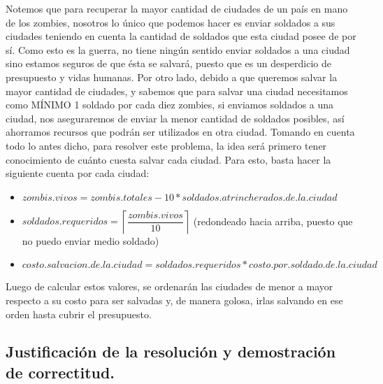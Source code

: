 Notemos que para recuperar la mayor cantidad de ciudades de un país en mano de los zombies, nosotros lo único que podemos hacer es enviar soldados a sus ciudades teniendo en cuenta la cantidad de soldados que esta ciudad posee de por sí. Como esto es la guerra, no tiene ningún sentido enviar soldados a una ciudad sino estamos seguros de que ésta se salvará, puesto que es un desperdicio de presupuesto y vidas humanas. Por otro lado, debido a que queremos salvar la mayor cantidad de ciudades, y sabemos que para salvar una ciudad necesitamos como MÍNIMO 1 soldado por cada diez zombies, si enviamos soldados a una ciudad, nos aseguraremos de enviar la menor cantidad de soldados posibles, así ahorramos recursos que podrán ser utilizados en otra ciudad. Tomando en cuenta todo lo antes dicho, para resolver este problema, la idea será primero tener conocimiento de cuánto cuesta salvar cada ciudad. Para esto, basta hacer la siguiente cuenta por cada ciudad: %
\begin{itemize}
   \item $zombis.vivos = zombis.totales - 10 * soldados.atrincherados.de.la.ciudad$
   \item $soldados.requeridos = \left \lceil \dfrac{zombis.vivos}{10} \right \rceil$ (redondeado hacia arriba, puesto que no puedo enviar medio soldado)
   \item $costo.salvacion.de.la.ciudad = soldados.requeridos * costo.por.soldado.de.la.ciudad$
\end{itemize}

Luego de calcular estos valores, se ordenarán las ciudades de menor a mayor respecto a su costo para ser salvadas y, de manera golosa, irlas salvando en ese orden hasta cubrir el presupuesto.


\vspace*{0.6cm}

\subsection{Justificación de la resolución y demostración de correctitud.}

\vspace*{0.3cm}

